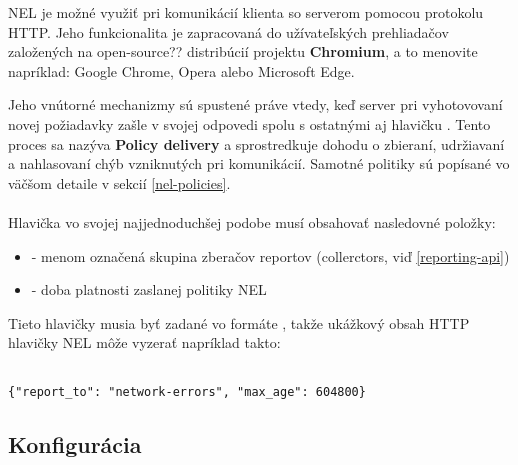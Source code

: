 NEL je možné využiť pri komunikácií klienta so serverom pomocou protokolu HTTP. Jeho funkcionalita je zapracovaná do užívateľských 
prehliadačov založených na open-source?? distribúcií projektu \textbf{Chromium}, a to menovite napríklad: Google Chrome, Opera alebo 
Microsoft Edge. 

Jeho vnútorné mechanizmy sú spustené práve vtedy, keď server pri vyhotovovaní novej požiadavky zašle v svojej odpovedi spolu s ostatnými 
aj hlavičku . Tento proces sa nazýva \textbf{Policy delivery} a sprostredkuje dohodu o zbieraní, udržiavaní a nahlasovaní chýb 
vzniknutých pri komunikácií. Samotné politiky sú popísané vo väčšom detaile v sekcií \ref{nel-policies}.
\\
\\
Hlavička  vo svojej najjednoduchšej podobe musí obsahovať nasledovné položky: 

\begin{itemize}
    \item {} - menom označená skupina zberačov reportov (collerctors, viď \ref{reporting-api}) 
    \item {} - doba platnosti zaslanej politiky NEL
\end{itemize}

Tieto hlavičky musia byť zadané vo formáte , takže ukážkový obsah HTTP hlavičky NEL môže vyzerať 
napríklad takto:

\begin{lstlisting}[caption={Ukážka obsahu najjednoduchšej/minimálnej HTTP hlavičky NEL. Akékoľvek chyby budú hlásené do skupiny 
    \code{network-errors} po dobu platnosti tejto politiky, ktorá bola nastavená na 7 dní (604 800 / 60s / 60min / 24h)}]

{"report_to": "network-errors", "max_age": 604800}

\end{lstlisting}

\subsection{Konfigurácia}

